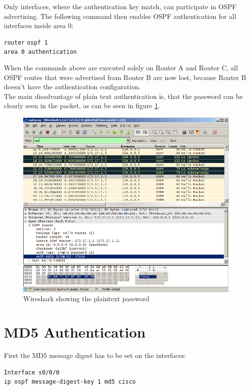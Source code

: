 Only interfaces, where the authentication key match, can participate in OSPF advertising.
The following command then enables OSPF authentication for all interfaces inside area 0:

\begin{tabbing}
\texttt{router} \= \texttt{ospf 1} \\
\> \texttt{area 0 authentication}
\end{tabbing}

When the commands above are executed solely on Router A and Router C, all OSPF routes that were advertised from Router B are now lost, because Router B doesn't have the authentication configuration. \\
The main disadvantage of plain text authentication is, that the password can be clearly seen in the packet, as can be seen in figure \ref{img:OSPF_Plaintext}.

\begin{figure}[H]
	\centering
	\includegraphics[width=1.0\textwidth]{img/wireshark_ospf_cisco.png}
	\caption{Wireshark showing the plaintext password}
	\label{img:OSPF_Plaintext}
\end{figure}



\pagebreak
\section{MD5 Authentication}

First the MD5 message digest has to be set on the interfaces:
\begin{tabbing}
\texttt{Interf}\= \texttt{ace s0/0/0} \\
\> \texttt{ip ospf message-digest-key 1 md5 cisco}
\end{tabbing}

